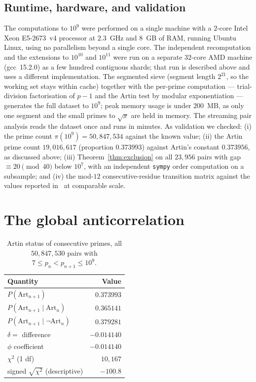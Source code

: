 \documentclass[11pt]{amsart}
\theoremstyle{definition}
\newcommand{\Art}{\mathrm{Art}}
\begin{document}
\subsection*{Runtime, hardware, and validation}
The computations to $10^9$ were performed on a single machine with a $2$-core
Intel Xeon E5-2673~v4 processor at $2.3$~GHz and $8$~GB of RAM, running Ubuntu
Linux, using no parallelism beyond a single core. The independent
recomputation and the extensions to $10^{10}$ and $10^{11}$ were run on a
separate $32$-core AMD machine (gcc~15.2.0) as a few hundred contiguous
shards; that run is described above and uses a different implementation. The
segmented sieve (segment length $2^{21}$, so the working set stays within
cache) together with the per-prime computation --- trial-division
factorisation of $p - 1$ and the Artin test by modular exponentiation ---
generates the full dataset to $10^9$; peak memory usage is
under $200$~MB, as only one segment and the small primes to $\sqrt{x}$ are
held in memory. The streaming pair analysis reads the dataset once and runs in
minutes. As validation we checked: (i) the prime count $\pi(10^9) =
	50{,}847{,}534$ against the known value; (ii) the Artin prime count
$19{,}016{,}617$ (proportion $0.373993$) against Artin's constant
$0.373956$, as discussed above; (iii) Theorem~\ref{thm:exclusion} on all
$23{,}956$ pairs with gap $\equiv 20 \pmod{40}$ below $10^7$, with an
independent \texttt{sympy} order computation on a subsample; and (iv) the
mod-$12$ consecutive-residue transition matrix against the values reported
in~\cite{LOS2016} at comparable scale.

\section{The global anticorrelation}
\label{sec:global}

\begin{table}[ht]
	\centering
	\caption{Artin status of consecutive primes, all $50{,}847{,}530$ pairs with
	$7 \le p_n < p_{n+1} \le 10^9$.}
	\label{tab:global}
	\begin{tabular}{lr}
		\toprule
		Quantity                         & Value       \\
		\midrule
		$P(\Art_{n+1})$                  & $0.373993$  \\
		$P(\Art_{n+1} \mid \Art_n)$      & $0.365141$  \\
		$P(\Art_{n+1} \mid \lnot\Art_n)$ & $0.379281$  \\
		$\delta = $ difference           & $-0.014140$ \\
		$\phi$ coefficient               & $-0.014140$ \\
		$\chi^2$ (1 df)                  & $10{,}167$  \\
		signed $\sqrt{\chi^2}$ (descriptive)              & $-100.8$    \\
		\bottomrule
	\end{tabular}
\end{table}
\end{document}

